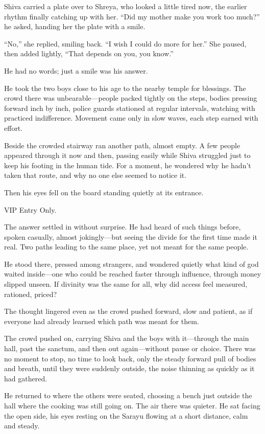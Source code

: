 Shiva carried a plate over to Shreya, who looked a little tired now, the earlier rhythm finally catching up with her. ``Did my mother make you work too much?'' he asked, handing her the plate with a smile.

``No,'' she replied, smiling back. ``I wish I could do more for her.'' She paused, then added lightly, ``That depends on you, you know.''

He had no words; just a smile was his answer.

He took the two boys close to his age to the nearby temple for blessings. The crowd there was unbearable—people packed tightly on the steps, bodies pressing forward inch by inch, police guards stationed at regular intervals, watching with practiced indifference. Movement came only in slow waves, each step earned with effort.

Beside the crowded stairway ran another path, almost empty. A few people appeared through it now and then, passing easily while Shiva struggled just to keep his footing in the human tide. For a moment, he wondered why he hadn't taken that route, and why no one else seemed to notice it.

Then his eyes fell on the board standing quietly at its entrance.

VIP Entry Only.

The answer settled in without surprise. He had heard of such things before, spoken casually, almost jokingly—but seeing the divide for the first time made it real. Two paths leading to the same place, yet not meant for the same people.

He stood there, pressed among strangers, and wondered quietly what kind of god waited inside—one who could be reached faster through influence, through money slipped unseen. If divinity was the same for all, why did access feel measured, rationed, priced?

The thought lingered even as the crowd pushed forward, slow and patient, as if everyone had already learned which path was meant for them.

The crowd pushed on, carrying Shiva and the boys with it—through the main hall, past the sanctum, and then out again—without pause or choice. There was no moment to stop, no time to look back, only the steady forward pull of bodies and breath, until they were suddenly outside, the noise thinning as quickly as it had gathered.

He returned to where the others were seated, choosing a bench just outside the hall where the cooking was still going on. The air there was quieter. He sat facing the open side, his eyes resting on the Sarayu flowing at a short distance, calm and steady.


